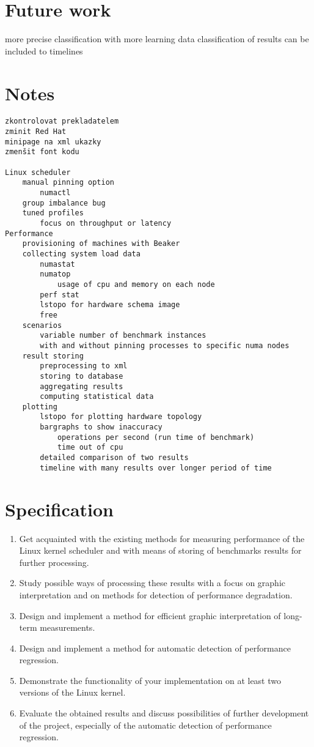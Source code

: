 \chapter{Future work}
more precise classification with more learning data
classification of results can be included to timelines

\chapter{Notes}
\begin{verbatim}
zkontrolovat prekladatelem
zminit Red Hat
minipage na xml ukazky
zmenšit font kodu

Linux scheduler
    manual pinning option
        numactl
    group imbalance bug
    tuned profiles
        focus on throughput or latency
Performance
    provisioning of machines with Beaker
    collecting system load data
        numastat
        numatop
            usage of cpu and memory on each node
        perf stat
        lstopo for hardware schema image
        free
    scenarios
        variable number of benchmark instances
        with and without pinning processes to specific numa nodes
    result storing
        preprocessing to xml
        storing to database
        aggregating results
        computing statistical data
    plotting
        lstopo for plotting hardware topology
        bargraphs to show inaccuracy
            operations per second (run time of benchmark)
            time out of cpu
        detailed comparison of two results
        timeline with many results over longer period of time
\end{verbatim}

\chapter{Specification}
\begin{enumerate}
\item Get acquainted with the existing methods for measuring performance of the Linux kernel scheduler and with means of storing of benchmarks results for further processing.
\item Study possible ways of processing these results with a focus on graphic interpretation and on methods for detection of performance degradation.
\item Design and implement a method for efficient graphic interpretation of long-term measurements.
\item Design and implement a method for automatic detection of performance regression.
\item Demonstrate the functionality of your implementation on at least two versions of the Linux kernel.
\item Evaluate the obtained results and discuss possibilities of further development of the project, especially of the automatic detection of performance regression.
\end{enumerate}

